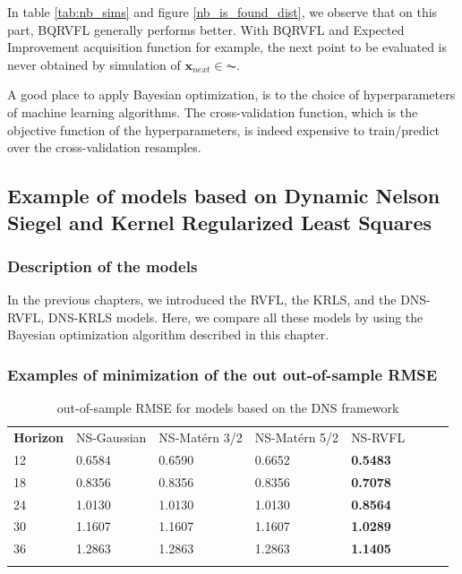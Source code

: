 In table \ref{tab:nb_sims} and figure \ref{nb_is_found_dist}, we observe that on this part, BQRVFL generally performs better. With BQRVFL and Expected Improvement acquisition function for example, the next point to be evaluated is never obtained by simulation of $\textbf{x}_{next} \in \AC$. 


A good place to apply Bayesian optimization, is to the choice of hyperparameters of machine learning algorithms. The cross-validation function, which is the objective function of the hyperparameters, is indeed expensive to train/predict over the cross-validation resamples.  

\subsection{Example of models based on Dynamic Nelson Siegel and Kernel Regularized Least Squares}

\subsubsection{Description of the models}

In the previous chapters, we introduced the RVFL, the KRLS, and the DNS-RVFL, DNS-KRLS models. Here, we compare all these models by using the Bayesian optimization algorithm described in this chapter.  

\subsubsection{Examples of minimization of the out out-of-sample RMSE}


\begin{table}[!htb]
\begin{center}
\caption{out-of-sample RMSE for models based on the DNS framework}
\label{tab:min_value_ns}       %
\begin{tabular}{llllllll}
\hline\noalign{\smallskip}
\textbf{Horizon} & NS-Gaussian & NS-Mat\'ern 3/2  & NS-Mat\'ern 5/2 & NS-RVFL \\
\noalign{\smallskip}\hline\noalign{\smallskip}
 12 & 0.6584  &  0.6590   &   0.6652 & \textbf{0.5483} \\
 18 & 0.8356  &  0.8356   &   0.8356 & \textbf{0.7078} \\
 24 & 1.0130  &  1.0130   &   1.0130 & \textbf{0.8564}\\
 30 & 1.1607  &  1.1607   &   1.1607 & \textbf{1.0289} \\
 36 & 1.2863  &  1.2863   &   1.2863 & \textbf{1.1405} \\
\noalign{\smallskip}\hline
\end{tabular}
\end{center}
\end{table}

